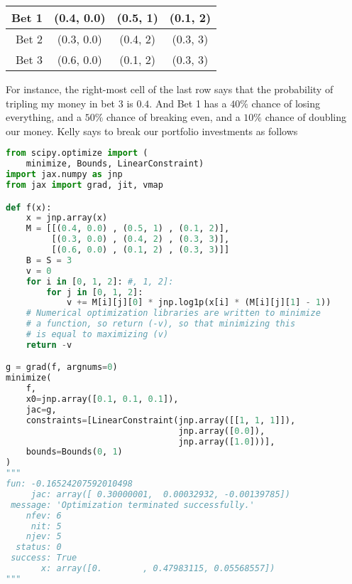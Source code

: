 \documentclass{article}
\begin{document}
\begin{tabular}{r|c|c|c}
     Bet 1& (0.4, 0.0) & (0.5, 1) & (0.1, 2)\\\hline
     Bet 2& (0.3, 0.0) & (0.4, 2) & (0.3, 3)\\\hline
     Bet 3& (0.6, 0.0) & (0.1, 2) & (0.3, 3)\\
\end{tabular}

For instance, the right-most cell of the last row says that the probability of tripling my money in bet 3 is $0.4$. And Bet 1 has a $40\%$ chance of losing everything, and a $50\%$ chance of breaking even, and a $10\%$ chance of doubling our money. Kelly says to break our portfolio investments as follows

\begin{lstlisting}[language=Python]
from scipy.optimize import (
    minimize, Bounds, LinearConstraint)
import jax.numpy as jnp
from jax import grad, jit, vmap

def f(x):
    x = jnp.array(x)
    M = [[(0.4, 0.0) , (0.5, 1) , (0.1, 2)],
         [(0.3, 0.0) , (0.4, 2) , (0.3, 3)],
         [(0.6, 0.0) , (0.1, 2) , (0.3, 3)]]
    B = S = 3
    v = 0
    for i in [0, 1, 2]: #, 1, 2]:
        for j in [0, 1, 2]:
            v += M[i][j][0] * jnp.log1p(x[i] * (M[i][j][1] - 1))
    # Numerical optimization libraries are written to minimize
    # a function, so return (-v), so that minimizing this
    # is equal to maximizing (v)
    return -v

g = grad(f, argnums=0)
minimize(
    f,
    x0=jnp.array([0.1, 0.1, 0.1]), 
    jac=g, 
    constraints=[LinearConstraint(jnp.array([[1, 1, 1]]),
                                  jnp.array([0.0]),
                                  jnp.array([1.0]))],
    bounds=Bounds(0, 1)
)
"""
fun: -0.16524207592010498
     jac: array([ 0.30000001,  0.00032932, -0.00139785])
 message: 'Optimization terminated successfully.'
    nfev: 6
     nit: 5
    njev: 5
  status: 0
 success: True
       x: array([0.        , 0.47983115, 0.05568557])
"""
\end{lstlisting}
\end{document}
